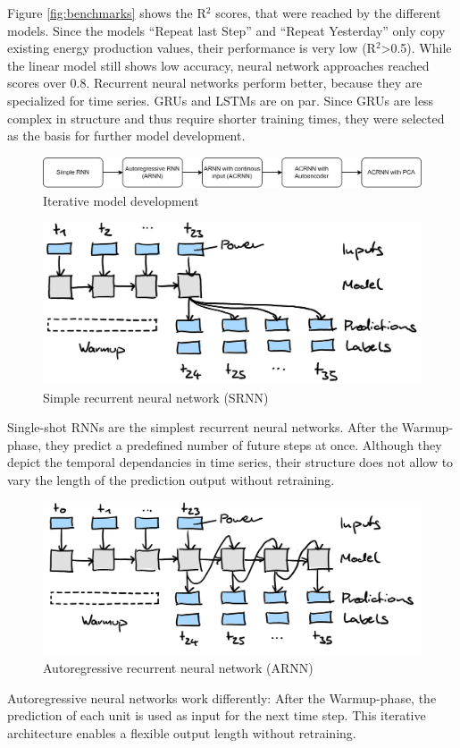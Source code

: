 \documentclass[11pt,table]{article}
\begin{document}
Figure \ref{fig:benchmarks} shows the R$^2$ scores, that were reached by the different models. Since the models 
``Repeat last Step'' and 
``Repeat Yesterday''
only copy existing energy production values, their performance is very low (R$^2$>0.5). While the linear model still shows low accuracy, neural network approaches reached scores over 0.8. Recurrent neural networks perform better, because they are specialized for time series. GRUs and LSTMs are on par. Since GRUs are less complex in structure and thus require shorter training times, they were selected as the basis for further model development.

\begin{figure}[H]
	\centering
	\includegraphics[scale=1]{Figures/modelEvolution.png}
	\caption{Iterative model development}
	\label{fig:modelEvo}
\end{figure}

\begin{figure}[H]
	\centering
	\includegraphics[scale=1]{Figures/SRNN.png}
	\caption{Simple recurrent neural network (SRNN)}
	\label{fig:SRNN}
\end{figure}
Single-shot RNNs are the simplest recurrent neural networks. After the Warmup-phase, they predict a predefined number of future steps at once. Although they depict the temporal dependancies in time series, their structure does not allow to vary the length of the prediction output without retraining.
\begin{figure}[H]
	\centering
	\includegraphics[scale=1]{Figures/ARNN.png}
	\caption{Autoregressive recurrent neural network (ARNN)}
	\label{fig:ARNN}
\end{figure}
Autoregressive neural networks work differently: After the Warmup-phase, the prediction of each unit is used as input for the next time step. This iterative architecture enables a flexible output length without retraining.\\
\end{document}
